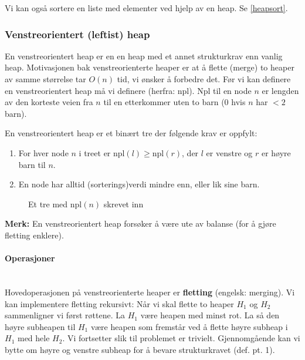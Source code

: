 Vi kan også sortere en liste med elementer ved hjelp av en heap. Se \ref{heapsort}.



\subsubsection{Venstreorientert (leftist) heap}
En venstreorientert heap er en en heap med et annet strukturkrav enn vanlig heap. Motivasjonen bak venstreorienterte heaper er at å flette (merge) to heaper av samme størrelse tar $ O(n) $ tid, vi ønsker å forbedre det. Før vi kan definere en venstreorientert heap må vi definere  (herfra: npl). Npl til en node $ n $ er lengden av den korteste veien fra $ n $ til en etterkommer uten to barn ($ 0 $ hvis $ n $ har $ <2 $ barn). 

\begin{definisjon} En venstreorientert heap er et binært tre der følgende krav er oppfylt:
\begin{enumerate}
\item For hver node $ n $ i treet er $ \text{npl}(l) \geq \text{npl}(r) $, der $ l $ er venstre og $ r $ er høyre barn til $ n $.
\item En node har alltid (sorterings)verdi mindre enn, eller lik sine barn. 
\end{enumerate}
\end{definisjon}

\begin{figure}[H]
\centering
\caption{Et tre med $ \text{npl}(n) $ skrevet inn}
\end{figure}

\noindent \textbf{Merk:} En venstreorientert heap forsøker å være ute av balanse (for å gjøre fletting enklere).

\paragraph{Operasjoner}~\\
Hovedoperasjonen på venstreorienterte heaper er \textbf{fletting} (engelsk: merging). Vi kan implementere fletting rekursivt: Når vi skal flette to heaper $ H_1 $ og $ H_2 $ sammenligner vi først røttene. La $ H_1 $ være heapen med minst rot. La så den høyre subheapen til $ H_1 $ være heapen som fremstår ved å flette høyre subheap i $ H_1 $ med hele $ H_2 $. Vi fortsetter slik til problemet er trivielt. Gjennomgående kan vi bytte om høyre og venstre subheap for å bevare strukturkravet (def. pt. 1).

